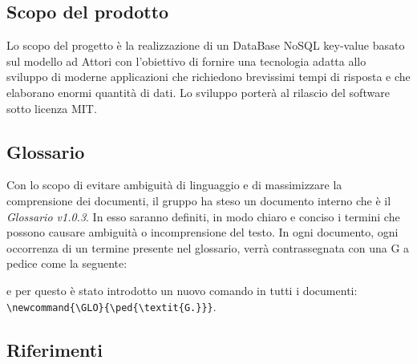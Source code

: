 \documentclass[a4paper]{article}
\begin{document}
		\subsection{Scopo del prodotto}
			Lo scopo del progetto è la realizzazione di un DataBase NoSQL key-value basato sul modello ad
			Attori con l'obiettivo di fornire una tecnologia adatta allo sviluppo di moderne
			applicazioni che richiedono brevissimi tempi di risposta e che elaborano enormi quantità
			di dati. Lo sviluppo porterà al rilascio del software sotto licenza MIT.
		\subsection{Glossario}
			Con lo scopo di evitare ambiguità di linguaggio e di massimizzare la comprensione dei documenti, il
	      	gruppo ha steso un documento interno che è il \emph{Glossario v1.0.3}. In esso saranno definiti, in modo
	      	chiaro e conciso i termini che possono causare ambiguità o incomprensione del testo. In ogni documento,
	      	ogni occorrenza di un termine presente nel glossario, verrà contrassegnata con una G a pedice come la seguente:
	      	\newline
	      	\begin{center}
	      	\end{center}
	      	e per questo è stato introdotto un nuovo comando in tutti i documenti: \\
	      	\verb|\newcommand{\GLO}{\ped{\textit{G.}}}|.
		\subsection{Riferimenti}
\end{document}

